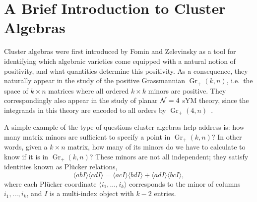 \documentclass[12pt]{article}
\DeclareMathOperator{\Gr}{Gr}
\def\ket#1{\langle #1 \rangle}
\begin{document}



\section{A Brief Introduction to Cluster Algebras} \label{sec:brief_intro}

Cluster algebras were first introduced by Fomin and Zelevinsky \cite{1021.16017} as a tool for identifying which algebraic varieties come equipped with a natural notion of positivity, and what quantities determine this positivity. As a consequence, they naturally appear in the study of the positive Grassmannian $\Gr_{+}(k,n)$, i.e.~the space of $k\times n$ matrices where all ordered $k\times k$ minors are positive. They correspondingly also appear in the study of planar ${\cal N} = 4$ sYM theory, since the integrands in this theory are encoded to all orders by $\Gr_+(4,n)$~\cite{ArkaniHamed:2012nw}.

A simple example of the type of questions cluster algebras help address is: how many matrix minors are sufficient to specify a point in $\Gr_+(k,n)$? In other words, given a $k \times n$ matrix, how many of its minors do we have to calculate to know if it is in $\Gr_+(k,n)$? These minors are not all independent; they satisfy identities known as Pl\"ucker relations,
\begin{equation}
  \label{eq:plucker-rel}
  \ket{abI} \ket{cdI} = \ket{acI} \ket{bdI} + \ket{adI}\ket{bcI},
\end{equation}
where each Pl\"ucker coordinate $\ket{i_1,\ldots,i_k}$ corresponds to the minor of columns $i_1, \ldots,i_k$, and $I$ is a multi-index object with $k-2$ entries.
\end{document}
